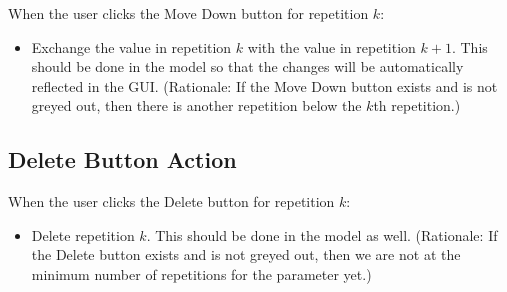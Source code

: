 \documentclass[11pt]{article}
\begin{document}
When the user clicks the Move Down button for repetition $k$:
\begin{itemize}
\item Exchange the value in repetition $k$ with the value in repetition $k+1$.
  This should be done in the model so that the changes will be automatically
  reflected in the GUI.
  (Rationale:  If the Move Down button exists and is not greyed out, then
  there is another repetition below the $k$th repetition.)
\end{itemize}

\subsection{Delete Button Action}

When the user clicks the Delete button for repetition $k$:
\begin{itemize}
\item Delete repetition $k$.  This should be done in the model as well.
  (Rationale:  If the Delete button exists and is not greyed out, then
  we are not at the minimum number of repetitions for the parameter yet.)
\end{itemize}
\end{document}
